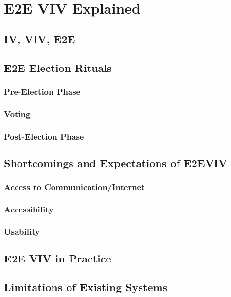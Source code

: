 \chapter{E2E VIV Explained}
\label{chapter:e2e_viv_explained}

\section{IV, VIV, E2E}
\section{E2E Election Rituals}
\subsection{Pre-Election Phase}
\subsection{Voting}
\subsection{Post-Election Phase}
\section{Shortcomings and Expectations of E2EVIV}
\subsection{Access to Communication/Internet}
\subsection{Accessibility}
\subsection{Usability}
\section{E2E VIV in Practice}
\section{Limitations of Existing Systems}
